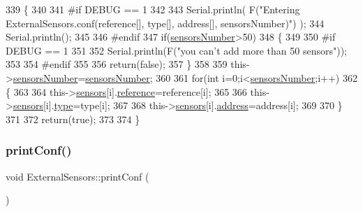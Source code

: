 \begin{DoxyCode}
339 \{
340 
341 \textcolor{preprocessor}{#if DEBUG == 1}
342 
343     Serial.println( F(\textcolor{stringliteral}{"Entering ExternalSensors.conf(reference[], type[], address[], sensorsNumber)"}) );
344     Serial.println();
345 
346 \textcolor{preprocessor}{#endif  }
347     \textcolor{keywordflow}{if}(\hyperlink{class_external_sensors_a58e4fbf9adeae787d92be5fa33043b5d}{sensorsNumber}>50)
348     \{
349     
350 \textcolor{preprocessor}{    #if DEBUG == 1}
351     
352         Serial.println(F(\textcolor{stringliteral}{"you can't add more than 50 sensors"}));    
353     
354 \textcolor{preprocessor}{    #endif  }
355     
356         \textcolor{keywordflow}{return}(\textcolor{keyword}{false});
357     \}
358 
359     this->\hyperlink{class_external_sensors_a58e4fbf9adeae787d92be5fa33043b5d}{sensorsNumber}=\hyperlink{class_external_sensors_a58e4fbf9adeae787d92be5fa33043b5d}{sensorsNumber};
360     
361     \textcolor{keywordflow}{for}(\textcolor{keywordtype}{int} i=0;i<\hyperlink{class_external_sensors_a58e4fbf9adeae787d92be5fa33043b5d}{sensorsNumber};i++)
362     \{
363     
364         this->\hyperlink{class_external_sensors_a284233f884fcf00154a44740cf1d9e1e}{sensors}[i].\hyperlink{struct_external_sensors_1_1sensor_afed5bdfd49732202a368b600cb8396fe}{reference}=reference[i];
365         
366         this->\hyperlink{class_external_sensors_a284233f884fcf00154a44740cf1d9e1e}{sensors}[i].\hyperlink{struct_external_sensors_1_1sensor_a6acfdb02c742c2110d7bd2b5d9fce9e7}{type}=type[i];
367 
368         this->\hyperlink{class_external_sensors_a284233f884fcf00154a44740cf1d9e1e}{sensors}[i].\hyperlink{struct_external_sensors_1_1sensor_a8d70ca58524521ed054fc6b81eb58d34}{address}=address[i];
369     
370     \}
371     
372     \textcolor{keywordflow}{return}(\textcolor{keyword}{true});
373 
374 \}
\end{DoxyCode}
\mbox{\label{class_external_sensors_a78c2bf55084435dd51d3c559b2d3c6f3}} 
\subsubsection{\texorpdfstring{print\+Conf()}{printConf()}}
{\footnotesize\ttfamily void External\+Sensors\+::print\+Conf (\begin{DoxyParamCaption}{ }\end{DoxyParamCaption})}

